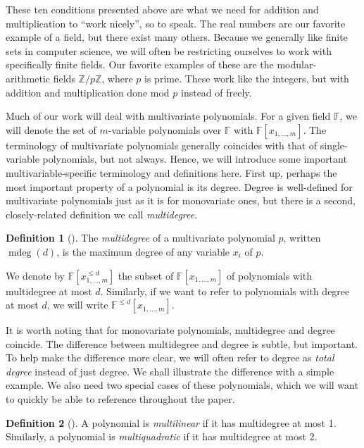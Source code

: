 \documentclass[english,12pt]{reedthesis}
\theoremstyle{plain}
\theoremstyle{definition}
\newtheorem{defn}[defn]{Definition}
\theoremstyle{remark}
\DeclareMathOperator{\mdeg}{mdeg}
\begin{document}
These ten conditions presented above are what we need for addition and
multiplication to ``work nicely'', so to speak. The real numbers are our
favorite example of a field, but there exist many others. Because we generally
like finite sets in computer science, we will often be restricting ourselves to
work with specifically finite fields. Our favorite examples of these are the
modular-arithmetic fields $\mathbb{Z}/p\mathbb{Z}$, where $p$ is prime. These work like the
integers, but with addition and multiplication done mod $p$ instead of freely.

Much of our work will deal with multivariate polynomials. For a given field
$\mathbb{F}$, we will denote the set of $m$-variable polynomials over
$\mathbb{F}$ with $\mathbb{F}[x_{1, \ldots, m}]$. The terminology of multivariate
polynomials generally coincides with that of single-variable polynomials, but
not always. Hence, we will introduce some important multivariable-specific
terminology and definitions here. First up, perhaps the most important property
of a polynomial is its degree. Degree is well-defined for multivariate
polynomials just as it is for monovariate ones, but there is a second,
closely-related definition we call \emph{multidegree}.

\begin{defn}[{\cite[8]{AW09}}]\label{def:mdeg}
  The \emph{multidegree} of a multivariate polynomial $p$, written $\mdeg(d)$,
  is the maximum degree of any variable $x_{i}$ of $p$.

  We denote by $\mathbb{F}[x_{1, \ldots, m}^{\le d}]$ the subset of
  $\mathbb{F}[x_{1, \ldots, m}]$ of polynomials with multidegree at most $d$.
  Similarly, if we want to refer to polynomials with degree at most $d$, we will
  write $\mathbb{F}^{\le d}[x_{1, \ldots, m}]$.
\end{defn}

It is worth noting that for monovariate polynomials, multidegree and degree
coincide. The difference between multidegree and degree is subtle, but
important. To help make the difference more clear, we will often refer to degree
as \emph{total degree} instead of just degree. We shall
illustrate the difference with a simple example. We also need two special cases
of these polynomials, which we will want to quickly be able to reference
throughout the paper.

\begin{defn}[{\cite[8]{AW09}}]\label{def:mlin}
  A polynomial is \emph{multilinear} if it has multidegree at most 1. Similarly,
  a polynomial is \emph{multiquadratic} if it has multidegree at most 2.
\end{defn}
\end{document}
